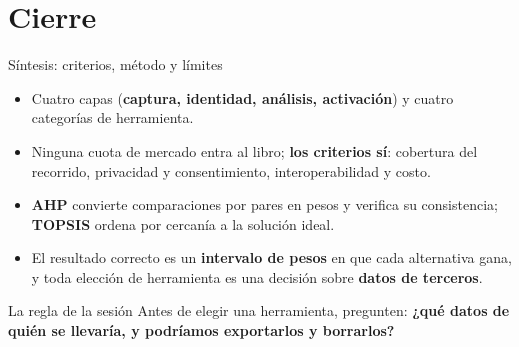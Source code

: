 \documentclass[aspectratio=169,xcolor=dvipsnames]{beamer}
\begin{document}
\section{Cierre}

\begin{frame}{Síntesis: criterios, método y límites}
\begin{itemize}
  \small
  \item Cuatro capas (\textbf{captura, identidad, análisis, activación}) y cuatro categorías de herramienta.
  \item Ninguna cuota de mercado entra al libro; \textbf{los criterios sí}: cobertura del recorrido, privacidad y consentimiento, interoperabilidad y costo.
  \item \textbf{AHP} convierte comparaciones por pares en pesos y verifica su consistencia; \textbf{TOPSIS} ordena por cercanía a la solución ideal.
  \item El resultado correcto es un \textbf{intervalo de pesos} en que cada alternativa gana, y toda elección de herramienta es una decisión sobre \textbf{datos de terceros}.
\end{itemize}
\vspace{4pt}
\begin{alertblock}{La regla de la sesión}
  \small Antes de elegir una herramienta, pregunten: \textbf{¿qué datos de quién se llevaría, y podríamos exportarlos y borrarlos?}
\end{alertblock}
\end{frame}
\end{document}
